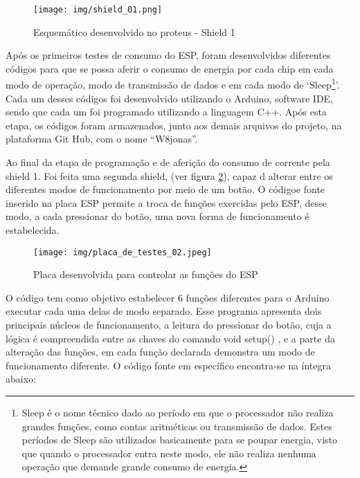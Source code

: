 \begin{figure}[htp]
    \centering
    \texttt{[image: img/shield\_01.png]}
    \caption{Esquemático desenvolvido no proteus - Shield 1}
    \label{fig:esquematico_placa_de_testes_01}
\end{figure}

{
Após os primeiros testes de consumo do ESP, foram desenvolvidos diferentes códigos para que se possa aferir o consumo de energia por cada chip em cada modo de operação, modo de transmissão de dados e em cada modo de ‘Sleep\footnote{Sleep é o nome técnico dado ao período em que o processador não realiza grandes funções, como contas aritméticas ou transmissão de dados. Estes períodos de Sleep são utilizados basicamente para se poupar energia, visto que quando o processador entra neste modo, ele não realiza nenhuma operação que demande grande consumo de energia.}’. Cada um desses códigos foi desenvolvido utilizando o Arduino, software IDE, sendo que cada um foi programado utilizando a linguagem C++. Após esta etapa, os códigos foram armazenados, junto aos demais arquivos do projeto, na plataforma Git Hub, com o nome “W8jonas”.
}

{
Ao final da etapa de programação e de aferição do consumo de corrente pela shield 1. Foi feita uma segunda shield, (ver figura \ref{fig:placa_de_testes_02}), capaz d alterar entre os diferentes modos de funcionamento por meio de um botão. O códigoe fonte inserido na placa ESP permite a troca de funções exercidas pelo ESP, desse modo, a cada pressionar do botão, uma nova forma de funcionamento é estabelecida. 
}

\begin{figure}[htp]
    \centering
    \texttt{[image: img/placa\_de\_testes\_02.jpeg]}
    \caption{Placa desenvolvida para controlar as funções do ESP}
    \label{fig:placa_de_testes_02}
\end{figure}

{
O código tem como objetivo estabelecer 6 funções diferentes para o Arduino executar cada uma delas de modo separado. Esse programa apresenta dois principais núcleos de funcionamento, a leitura do pressionar do botão, cuja a lógica é compreendida entre as chaves do comando void setup(){ }, e a parte da alteração das funções, em cada função declarada demonstra um modo de funcionamento diferente.
\newline
O código fonte em específico encontra-se na íntegra abaixo:
}

